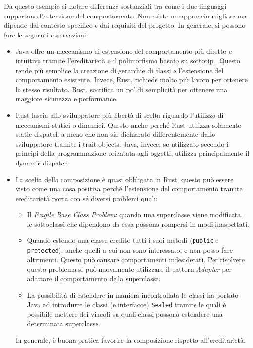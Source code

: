 Da questo esempio si notare differenze sostanziali tra come i due linguaggi supportano l'estensione del comportamento. Non esiste un approccio migliore ma dipende dal contesto specifico e dai requisiti del progetto. In generale, si possono fare le seguenti osservazioni:
\begin{itemize}
    \item Java offre un meccanismo di estensione del comportamento più diretto e intuitivo tramite l'ereditarietà e il polimorfismo basato su sottotipi. Questo rende più semplice la creazione di gerarchie di classi e l'estensione del comportamento esistente. Invece, Rust, richiede molto più lavoro per ottenere lo stesso risultato. Rust, sacrifica un po' di semplicità per ottenere una maggiore sicurezza e performance.
    \item Rust lascia allo sviluppatore più libertà di scelta riguardo l'utilizzo di meccanismi statici o dinamici. Questo anche perché Rust utilizza solamente static dispatch a meno che non sia dichiarato differentemente dallo sviluppatore tramite i trait objects. Java, invece, se utilizzato secondo i principi della programmazione orientata agli oggetti, utilizza principalmente il dynamic dispatch.
    \item La scelta della composizione è quasi obbligata in Rust, questo può essere visto come una cosa positiva perché l'estensione del comportamento tramite ereditarietà porta con sé diversi problemi quali:
    \begin{itemize}
        \item Il \textit{Fragile Base Class Problem}: quando una superclasse viene modificata, le sottoclassi che dipendono da essa possono rompersi in modi inaspettati.
        \item Quando estendo una classe eredito tutti i suoi metodi (\texttt{public} e \texttt{protected}), anche quelli a cui non sono interessato, e non posso fare altrimenti. Questo può causare comportamenti indesiderati. Per risolvere questo problema si può nuovamente utilizzare il pattern \textit{Adapter} per adattare il comportamento della superclasse.
        \item La possibilità di estendere in maniera incontrollata le classi ha portato Java ad introdurre le classi (e interfacce) \texttt{Sealed} tramite le quali è possibile mettere dei vincoli su quali classi possono estendere una determinata superclasse.
    \end{itemize}
    In generale, è buona pratica favorire la composizione rispetto all'ereditarietà. 
\end{itemize}
